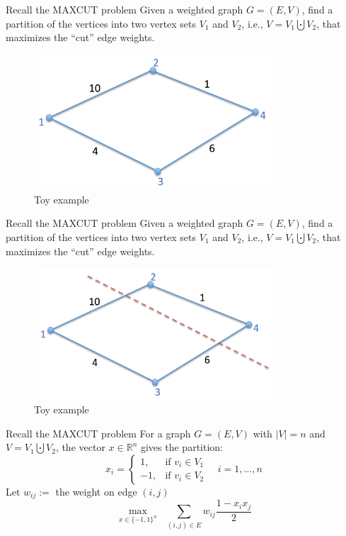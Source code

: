\documentclass{beamer}
\begin{document}
\begin{frame}{Recall the MAXCUT problem}
Given a weighted graph $G = (E, V)$, find a partition of the vertices into two vertex sets $V_1$ and $V_2$, i.e., $V = V_1\bigcupdot V_2$, that maximizes the ``cut'' edge weights.\\
\begin{figure}
  \caption{Toy example}
  \centering
    \includegraphics[width=0.8\textwidth]{toyGraph.png}
\end{figure}
\end{frame}

\begin{frame}{Recall the MAXCUT problem}
Given a weighted graph $G = (E, V)$, find a partition of the vertices into two vertex sets $V_1$ and $V_2$, i.e., $V = V_1\bigcupdot V_2$, that maximizes the ``cut'' edge weights.\\
\begin{figure}
  \caption{Toy example}
  \centering
    \includegraphics[width=0.8\textwidth]{toyGraph_withLine.png}
\end{figure}
\end{frame}


\begin{frame}{Recall the MAXCUT problem}
For a graph $G = (E,V)$ with $|V| = n$ and $V = V_1 \bigcupdot V_2$, the vector $x \in \mathbb{R}^n$ gives the partition:
$$
x_i = \begin{cases} 1, & \text{if } v_i \in V_1 \\
-1 , & \text{if } v_i \in V_2
\end{cases} \quad i = 1, \dots, n
$$
Let $w_{ij} := $ the weight on edge $(i,j)$
$$
\max_{x \in \{-1,1\}^n}\;\;  \sum_{(i,j) \in E} w_{ij}\frac{1-x_ix_j}{2}
$$
\end{frame}
\end{document}
